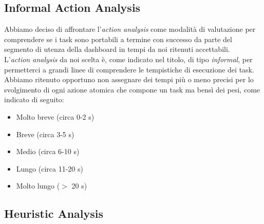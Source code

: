 \subsection{Informal Action Analysis}
\label{ss:informal-action-analysis}
Abbiamo deciso di affrontare l'\textit{action analysis} come modalità di valutazione per comprendere se i task sono portabili a termine con successo da parte del segmento di utenza della dashboard in tempi da noi ritenuti accettabili.\\
L'\textit{action analysis} da noi scelta è, come indicato nel titolo, di tipo \textit{informal}, per permetterci a grandi linee di comprendere le tempistiche di esecuzione dei task.\\
Abbiamo ritenuto opportuno non assegnare dei tempi più o meno precisi per lo svolgimento di ogni azione atomica che compone un task ma bensì dei pesi, come indicato di seguito:
\begin{itemize}
    \item Molto breve (circa 0-2 s)
    \item Breve (circa 3-5 s) 
    \item Medio (circa 6-10 s) 
    \item Lungo (circa 11-20 s) 
    \item Molto lungo ($>$ 20 s)
\end{itemize}








\subsection{Heuristic Analysis}
\label{ss:heuristic-analysis}

